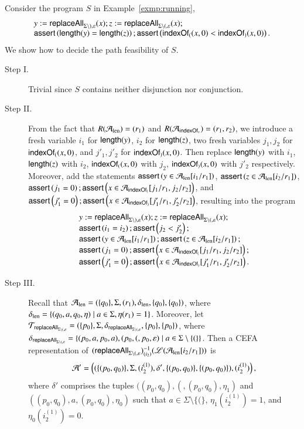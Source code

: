 \begin{example}
Consider the program $S$ in Example~\ref{exmp:running},
\[
\begin{array}{l}
y := \mathsf{replaceAll}_{\Sigma \setminus ), \varepsilon}(x); z:= \mathsf{replaceAll}_{\Sigma \setminus (, \varepsilon}(x);\\
\textsf{assert}\left(\mathsf{length}(y) = \mathsf{length}(z)\right); \textsf{assert}\left(\mathsf{indexOf}_{(}(x,0) < \mathsf{indexOf}_{)}(x,0)\right).
\end{array}
\] 
We show how to decide the path feasibility of $S$. 
\begin{description}
\item[Step I.]   Trivial since $S$ contains neither disjunction nor conjunction.
%
\item[Step II.] From the fact that $R(\mathcal{A}_{\rm len})=(r_1)$ and $R(\mathcal{A}_{\mathsf{indexOf}_v})=(r_1,r_2)$, we introduce a fresh variable $i_1$ for $\mathsf{length}(y)$, $i_2$ for $\mathsf{length}(z)$, two fresh variables $j_1, j_2$ for $\mathsf{indexOf}_{(}(x,0)$, and $j'_1,j'_2$ for $\mathsf{indexOf}_{)}(x,0)$. Then replace $\mathsf{length}(y)$ with $i_1$, $\mathsf{length}(z)$ with $i_2$, $\mathsf{indexOf}_{(}(x,0)$ with $j_2$, $\mathsf{indexOf}_{)}(x,0)$ with $j'_2$ respectively. Moreover, add the statements $\textsf{assert}\left(y \in \mathcal{A}_{\rm len}[i_1/r_1]\right)$, $\textsf{assert}\left(z \in \mathcal{A}_{\rm len}[i_2/r_1]\right)$, $\textsf{assert}\left(j_1 = 0\right); \textsf{assert}\left(x \in \mathcal{A}_{\mathsf{indexOf}_{(}}[j_1/r_1, j_2/r_2]\right)$, and $\textsf{assert}\left(j'_1 = 0\right); \textsf{assert}\left(x \in \mathcal{A}_{\mathsf{indexOf}_{)}}[j'_1/r_1, j'_2/r_2]\right)$, resulting into the program 
\[
\begin{array}{l}
y := \mathsf{replaceAll}_{\Sigma \setminus ), \varepsilon}(x); z:= \mathsf{replaceAll}_{\Sigma \setminus (, \varepsilon}(x);\\
\textsf{assert}\left(i_1 = i_2\right); \textsf{assert}\left( j_2 < j'_2\right);\\
\textsf{assert}\left(y \in \mathcal{A}_{\rm len}[i_1/r_1]\right); \textsf{assert}\left(z \in \mathcal{A}_{\rm len}[i_2/r_1]\right);\\
\textsf{assert}\left(j_1 = 0\right); \textsf{assert}\left(x \in \mathcal{A}_{\mathsf{indexOf}_{(}}[j_1/r_1, j_2/r_2]\right);  \\
\textsf{assert}\left(j'_1 = 0\right); \textsf{assert}\left(x \in \mathcal{A}_{\mathsf{indexOf}_{)}}[j'_1/r_1, j'_2/r_2]\right).
\end{array}
\] 
%
\item[Step III.] Recall that $\mathcal{A}_{\rm len}=(\{q_0\}, \Sigma, (r_1), \delta_{\rm len}, \{q_0\}, \{q_0\})$, where $\delta_{\rm len} = \{(q_0, a, q_0, \eta) \mid a \in \Sigma, \eta(r_1)=1\}$. Moreover, let $\mathcal{T}_{\mathsf{replaceAll}_{\Sigma \setminus (, \varepsilon}} = (\{p_0\}, \Sigma, \delta_{\mathsf{replaceAll}_{\Sigma \setminus (, \varepsilon}}, \{p_0\}, \{p_0\})$, where $\delta_{\mathsf{replaceAll}_{\Sigma \setminus (, \varepsilon}} = \{(p_0, a, p_0, a), (p_0, (, p_0, \varepsilon) \mid a \in \Sigma \setminus \{(\}\}$. Then a CEFA representation of $(\mathsf{replaceAll}_{\Sigma \setminus (, \varepsilon})^{-1}_{(i_2)}(\mathscr{L}(\mathcal{A}_{\rm len}[i_2/r_1]))$ is 
%
\[\mathcal{A}' = \left((\{(p_0, q_0)\}, \Sigma, (i^{(1)}_2), \delta', \{(p_0, q_0)\}, \{(p_0, q_0)\}), (i^{(1)}_2)\right),\]
%
where $\delta'$ comprises the tuples $((p_0,q_0), (, (p_0,q_0), \eta_1)$ and $((p_0,q_0), a, (p_0,q_0), \eta_0)$ such that $a \in \Sigma \setminus \{(\}$, $\eta_1(i^{(1)}_2)=1$, and $\eta_0(i^{(1)}_2)=0$. 


\end{description}
\end{example}
